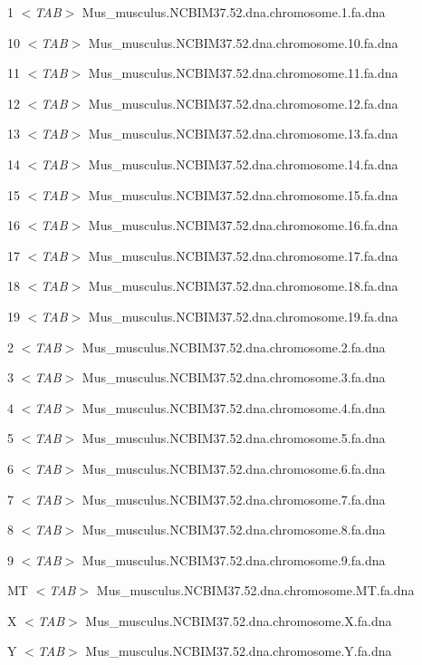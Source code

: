 1 {\itshape $<$TAB$>$\/} Mus\_\-musculus.NCBIM37.52.dna.chromosome.1.fa.dna \par
 10 {\itshape $<$TAB$>$\/} Mus\_\-musculus.NCBIM37.52.dna.chromosome.10.fa.dna \par
 11 {\itshape $<$TAB$>$\/} Mus\_\-musculus.NCBIM37.52.dna.chromosome.11.fa.dna \par
 12 {\itshape $<$TAB$>$\/} Mus\_\-musculus.NCBIM37.52.dna.chromosome.12.fa.dna \par
 13 {\itshape $<$TAB$>$\/} Mus\_\-musculus.NCBIM37.52.dna.chromosome.13.fa.dna \par
 14 {\itshape $<$TAB$>$\/} Mus\_\-musculus.NCBIM37.52.dna.chromosome.14.fa.dna \par
 15 {\itshape $<$TAB$>$\/} Mus\_\-musculus.NCBIM37.52.dna.chromosome.15.fa.dna \par
 16 {\itshape $<$TAB$>$\/} Mus\_\-musculus.NCBIM37.52.dna.chromosome.16.fa.dna \par
 17 {\itshape $<$TAB$>$\/} Mus\_\-musculus.NCBIM37.52.dna.chromosome.17.fa.dna \par
 18 {\itshape $<$TAB$>$\/} Mus\_\-musculus.NCBIM37.52.dna.chromosome.18.fa.dna \par
 19 {\itshape $<$TAB$>$\/} Mus\_\-musculus.NCBIM37.52.dna.chromosome.19.fa.dna \par
 2 {\itshape $<$TAB$>$\/} Mus\_\-musculus.NCBIM37.52.dna.chromosome.2.fa.dna \par
 3 {\itshape $<$TAB$>$\/} Mus\_\-musculus.NCBIM37.52.dna.chromosome.3.fa.dna \par
 4 {\itshape $<$TAB$>$\/} Mus\_\-musculus.NCBIM37.52.dna.chromosome.4.fa.dna \par
 5 {\itshape $<$TAB$>$\/} Mus\_\-musculus.NCBIM37.52.dna.chromosome.5.fa.dna \par
 6 {\itshape $<$TAB$>$\/} Mus\_\-musculus.NCBIM37.52.dna.chromosome.6.fa.dna \par
 7 {\itshape $<$TAB$>$\/} Mus\_\-musculus.NCBIM37.52.dna.chromosome.7.fa.dna \par
 8 {\itshape $<$TAB$>$\/} Mus\_\-musculus.NCBIM37.52.dna.chromosome.8.fa.dna \par
 9 {\itshape $<$TAB$>$\/} Mus\_\-musculus.NCBIM37.52.dna.chromosome.9.fa.dna \par
 MT {\itshape $<$TAB$>$\/} Mus\_\-musculus.NCBIM37.52.dna.chromosome.MT.fa.dna \par
 X {\itshape $<$TAB$>$\/} Mus\_\-musculus.NCBIM37.52.dna.chromosome.X.fa.dna \par
 Y {\itshape $<$TAB$>$\/} Mus\_\-musculus.NCBIM37.52.dna.chromosome.Y.fa.dna \par


